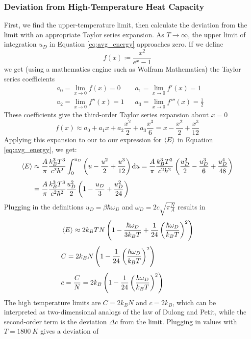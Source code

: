 \documentclass[11pt, a4paper]{article}
\newcommand*\diff{\mathop{}\!\mathrm{d}} %
\begin{document}
\subsubsection*{Deviation from High-Temperature Heat Capacity}
First, we find the upper-temperature limit, then calculate the deviation from the limit with an appropriate Taylor series expansion. As $ T \to \infty $, the upper limit of integration $ u_D $ in Equation \ref{eq:avg_energy} approaches zero. If we define
\begin{equation*}
	f(x) \coloneqq \frac{x^2}{e^x - 1}
\end{equation*}
we get (using a mathematics engine such as Wolfram Mathematica) the Taylor series coefficients 
\begin{align*}
	&a_0 = \lim_{x \to 0} f(x) = 0 && a_1 =\lim_{x \to 0} f'(x) = 1\\
	&a_2 = \lim_{x \to 0} f''(x) = 1 && a_3 = \lim_{x \to 0} f'''(x) = \frac{1}{2}
\end{align*}
These coefficients give the third-order Taylor series expansion about $ x = 0 $
\begin{equation*}
	f(x) \approx a_0 + a_1 x + a_2 \frac{x^2}{2} + a_3 \frac{x^3}{6} = x - \frac{x^2}{2} + \frac{x^3}{12}
\end{equation*}
Applying this expansion to our to our expression for $ \expval{E} $ in Equation \ref{eq:avg_energy}, we get:
\begin{align*}
	 \expval{E} &\approx \frac{A}{\pi} \frac{k_B^3 T^3}{c^2 \hbar^2} \int_{0}^{u_D} \left(u - \frac{u^2}{2} + \frac{u^3}{12}\right) \diff u = \frac{A}{\pi} \frac{k_B^3 T^3}{c^2 \hbar^2} \left(\frac{u_D^2}{2} - \frac{u_D^3}{6} + \frac{u_D^4}{48}\right)\\[1.0ex]
	 &= \frac{A}{\pi} \frac{k_B^3 T^3}{c^2 \hbar^2}\frac{u_D^2}{2} \left(1 - \frac{u_D}{3} + \frac{u_D^2}{24}\right)
\end{align*}
Plugging in the definitions $ u_D = \beta \hbar \omega_D $ and $ \omega_D =  2c\sqrt{\pi \frac{N }{A}} $ results in
\begin{align*}
	&\expval{E} \approx 2k_B T N\left(1 - \frac{\hbar \omega_D}{3k_B T} + \frac{1}{24}\left(\frac{\hbar \omega_D}{k_B T}\right)^2\right)\\[1.0ex]
	&C = 2k_B N \left(1 - \frac{1}{24}\left(\frac{\hbar \omega_D}{k_B T}\right)^2\right) \\[1.0ex]
	&c = \frac{C}{N}=  2k_B \left(1 - \frac{1}{24}\left(\frac{\hbar \omega_D}{k_B T}\right)^2\right)
\end{align*}
The high temperature limits are $ C = 2k_B N $ and $ c = 2k_B $, which can be interpreted as two-dimensional analogs of the law of Dulong and Petit, while the second-order term is the deviation $ \Delta c $ from the limit. Plugging in values with $ T = \SI{1800}{K} $ gives a deviation of
\end{document}
